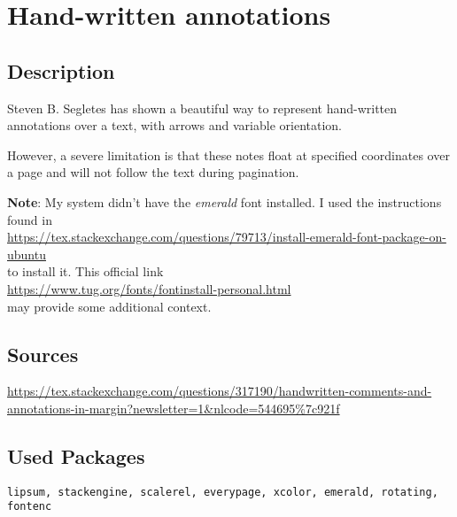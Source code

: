 \documentclass{article}
\begin{document}
\section*{Hand-written annotations }

\subsection*{Description}
Steven B. Segletes has shown a beautiful way to represent hand-written annotations over a text, with arrows and variable orientation.

However, a severe limitation is that these notes float at specified coordinates over a page and will not follow the text during pagination.

\textbf{Note}: My system didn't have the \textit{emerald} font installed. I used the instructions found in\\
\url{https://tex.stackexchange.com/questions/79713/install-emerald-font-package-on-ubuntu}\\
to install it.
This official link\\
\url{https://www.tug.org/fonts/fontinstall-personal.html}\\
may provide some additional context.

\subsection*{Sources}
\url{https://tex.stackexchange.com/questions/317190/handwritten-comments-and-annotations-in-margin?newsletter=1&nlcode=544695%7c921f}

\subsection*{Used Packages}
\verb|lipsum, stackengine, scalerel, everypage, xcolor, emerald, rotating, fontenc|
\end{document}
